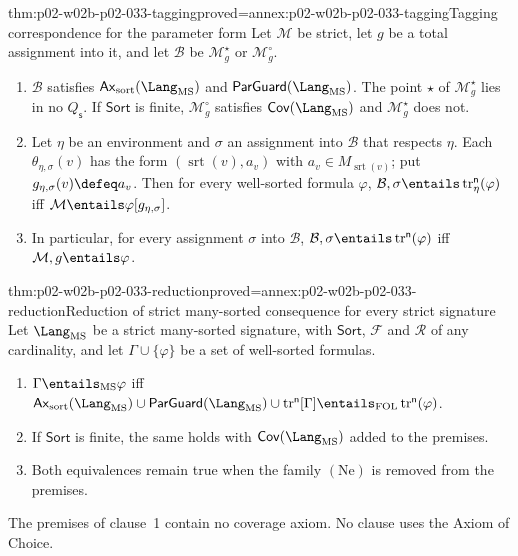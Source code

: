 \begin{hbtheorem}{thm:p02-w02b-p02-033-tagging}{proved=annex:p02-w02b-p02-033-tagging}{Tagging correspondence for the parameter form}
Let \(\mathcal M\) be strict, let \(g\) be a total assignment into it, and let
\(\mathcal B\) be \(\mathcal M^{\star}_{g}\) or \(\mathcal M^{\circ}_{g}\).
\begin{enumerate}
\item \(\mathcal B\) satisfies \(\mathsf{Ax}_{\mathrm{sort}}(\Lang_{\mathrm{MS}})\)
      and \(\mathsf{ParGuard}(\Lang_{\mathrm{MS}})\).  The point \(\star\) of
      \(\mathcal M^{\star}_{g}\) lies in no \(Q_{\mathsf s}\).  If
      \(\mathsf{Sort}\) is finite, \(\mathcal M^{\circ}_{g}\) satisfies
      \(\mathsf{Cov}(\Lang_{\mathrm{MS}})\) and \(\mathcal M^{\star}_{g}\)
      does not.
\item Let \(\eta\) be an environment and \(\sigma\) an assignment into
      \(\mathcal B\) that respects \(\eta\).  Each
      \(\theta_{\eta,\sigma}(v)\) has the form
      \((\operatorname{srt}(v),a_v)\) with
      \(a_v\in M_{\operatorname{srt}(v)}\); put
      \(g_{\eta,\sigma}(v)\defeq a_v\).  Then for every well-sorted formula
      \(\varphi\),
      \(\mathcal B,\sigma\entails\operatorname{tr}^{\mathsf n}_{\eta}(\varphi)\)
      iff \(\mathcal M\entails\varphi[g_{\eta,\sigma}]\).
\item In particular, for every assignment \(\sigma\) into \(\mathcal B\),
      \(\mathcal B,\sigma\entails\operatorname{tr}^{\mathsf n}(\varphi)\) iff
      \(\mathcal M,g\entails\varphi\).
\end{enumerate}
\end{hbtheorem}

\begin{hbtheorem}{thm:p02-w02b-p02-033-reduction}{proved=annex:p02-w02b-p02-033-reduction}{Reduction of strict many-sorted consequence for every strict signature}
Let \(\Lang_{\mathrm{MS}}\) be a strict many-sorted signature, with
\(\mathsf{Sort}\), \(\mathcal F\) and \(\mathcal R\) of any cardinality, and
let \(\Gamma\cup\{\varphi\}\) be a set of well-sorted formulas.
\begin{enumerate}
\item \(\Gamma\entails_{\mathrm{MS}}\varphi\) iff
      \(\mathsf{Ax}_{\mathrm{sort}}(\Lang_{\mathrm{MS}})\cup
      \mathsf{ParGuard}(\Lang_{\mathrm{MS}})\cup
      \operatorname{tr}^{\mathsf n}[\Gamma]\entails_{\mathrm{FOL}}
      \operatorname{tr}^{\mathsf n}(\varphi)\).
\item If \(\mathsf{Sort}\) is finite, the same holds with
      \(\mathsf{Cov}(\Lang_{\mathrm{MS}})\) added to the premises.
\item Both equivalences remain true when the family \((\mathrm{Ne})\) is
      removed from the premises.
\end{enumerate}
The premises of clause~1 contain no coverage axiom.  No clause uses the Axiom
of Choice.
\end{hbtheorem}

